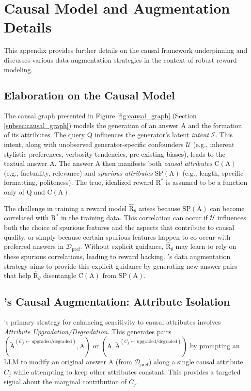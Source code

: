 \section{Causal Model and Augmentation Details}
\label{sec:causal_model_details}

This appendix provides further details on the causal framework underpinning \carma{} and discusses various data augmentation strategies in the context of robust reward modeling.

\subsection{Elaboration on the Causal Model}
The causal graph presented in Figure \ref{fig:causal_graph} (Section \ref{subsec:causal_graph}) models the generation of an answer $\mathrm{A}$ and the formation of its attributes. The query $\mathrm{Q}$ influences the generator's latent \textit{intent} $\mathcal{I}$. This intent, along with unobserved generator-specific confounders $\mathcal{U}$ (e.g., inherent stylistic preferences, verbosity tendencies, pre-existing biases), leads to the textual answer $\mathrm{A}$. The answer $\mathrm{A}$ then manifests both \textit{causal attributes} $\mathrm{C}(\mathrm{A})$ (e.g., factuality, relevance) and \textit{spurious attributes} $\mathrm{SP}(\mathrm{A})$ (e.g., length, specific formatting, politeness). The true, idealized reward $\mathrm{R}^*$ is assumed to be a function only of $\mathrm{Q}$ and $\mathrm{C}(\mathrm{A})$.

The challenge in training a reward model $\hat{\mathrm{R}}_\theta$ arises because $\mathrm{SP}(\mathrm{A})$ can become correlated with $\mathrm{R}^*$ in the training data. This correlation can occur if $\mathcal{U}$ influences both the choice of spurious features and the aspects that contribute to causal quality, or simply because certain spurious features happen to co-occur with preferred answers in $\mathcal{D}_{\mathrm{pref}}$. Without explicit guidance, $\hat{\mathrm{R}}_\theta$ may learn to rely on these spurious correlations, leading to reward hacking. \carma{}'s data augmentation strategy aims to provide this explicit guidance by generating new answer pairs that help $\hat{\mathrm{R}}_\theta$ disentangle $\mathrm{C}(\mathrm{A})$ from $\mathrm{SP}(\mathrm{A})$.

\subsection{\carma{}'s Causal Augmentation: Attribute Isolation}
\label{app:carma_causal_aug}
\carma{}'s primary strategy for enhancing sensitivity to causal attributes involves \textit{Attribute Upgradation/Degradation}. This generates pairs $(\tilde{\mathrm{A}}^{(C_j \leftarrow \text{upgraded/degraded})}, \mathrm{A})$ or $(\mathrm{A}, \tilde{\mathrm{A}}^{(C_j \leftarrow \text{upgraded/degraded})})$ by prompting an LLM to modify an original answer $\mathrm{A}$ (from $\mathcal{D}_{\mathrm{pref}}$) along a single causal attribute $C_j$ while attempting to keep other attributes constant. This provides a targeted signal about the marginal contribution of $C_j$.

